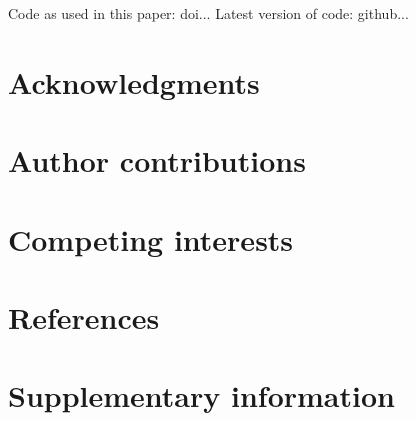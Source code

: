 \documentclass{article}
\begin{document}
Code as used in this paper: doi...
Latest version of code: github...

\section{Acknowledgments}

\section{Author contributions}




\section{Competing interests}

\section{References}




\section{Supplementary information}
\end{document}
